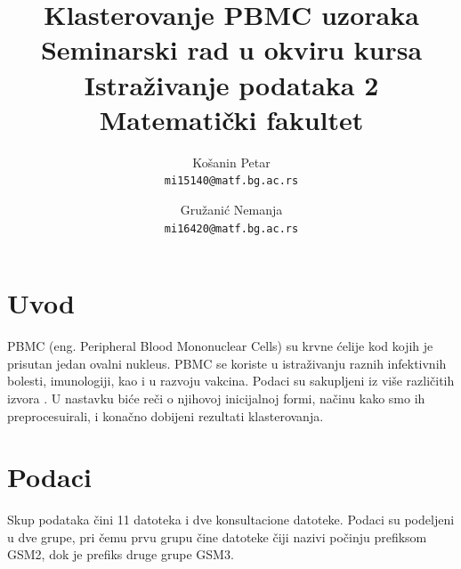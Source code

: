 \documentclass[a4paper]{article}
\begin{document}
\title{Klasterovanje PBMC uzoraka\\\small{Seminarski rad u okviru kursa\\Istraživanje podataka 2\\ Matematički fakultet}}

\author{
  Košanin Petar\\
  \texttt{mi15140@matf.bg.ac.rs}
    \and
  Gružanić Nemanja\\
  \texttt{mi16420@matf.bg.ac.rs}
}

\maketitle




\tableofcontents

\newpage







\section{Uvod}
PBMC (eng. Peripheral Blood Mononuclear Cells) su krvne ćelije kod kojih je prisutan jedan ovalni nukleus. PBMC se koriste u istraživanju raznih infektivnih bolesti, imunologiji, kao i u razvoju vakcina. Podaci su sakupljeni iz više različitih izvora \cite{shaikh2019classification}. U nastavku biće reči o njihovoj inicijalnoj formi, načinu kako smo ih preprocesuirali, i konačno dobijeni rezultati klasterovanja.

\section{Podaci}

Skup podataka čini 11 datoteka i dve konsultacione datoteke. Podaci su podeljeni u dve grupe, pri čemu prvu grupu čine datoteke čiji nazivi počinju prefiksom GSM2, dok je prefiks druge grupe GSM3.
\end{document}
